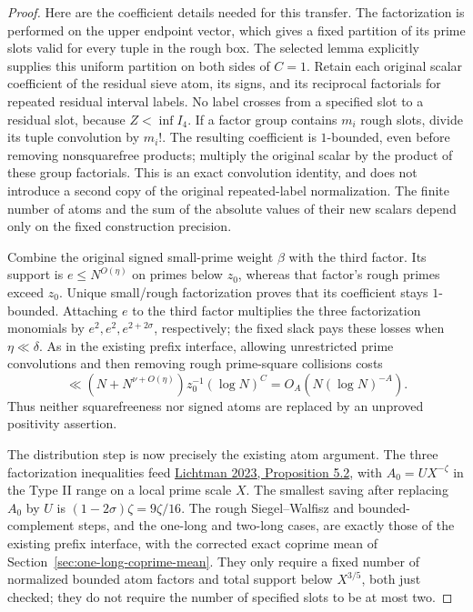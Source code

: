 \begin{proof}
Here are the coefficient details needed for this transfer.  The
factorization is performed on the upper endpoint vector, which
gives a fixed partition of its prime slots valid for every tuple
in the rough box.  The selected lemma explicitly supplies this
uniform partition on both sides of $C=1$.  Retain each original
scalar coefficient of the residual sieve atom, its signs, and its
reciprocal factorials for repeated residual interval labels.
No label crosses from a specified slot to a residual slot, because
$Z<\inf I_4$.  If a factor group contains $m_i$ rough slots,
divide its tuple convolution by $m_i!$.  The resulting coefficient
is $1$-bounded, even before removing nonsquarefree products; multiply
the original scalar by the product of these group factorials.
This is an exact convolution identity, and does not introduce a
second copy of the original repeated-label normalization.
The finite number of atoms and the sum of the absolute values of
their new scalars depend only on the fixed construction precision.

Combine the original signed small-prime weight $\beta$ with the
third factor.  Its support is $e\le N^{O(\eta)}$ on primes below
$z_0$, whereas that factor's rough primes exceed $z_0$.
Unique small/rough factorization proves that its coefficient stays
$1$-bounded.  Attaching $e$ to the third factor multiplies the three
factorization monomials by $e^2,e^2,e^{2+2\sigma}$, respectively;
the fixed slack pays these losses when $\eta\ll\delta$.
As in the existing prefix interface, allowing unrestricted prime
convolutions and then removing rough prime-square collisions costs
\[
 \ll (N+N^{\nu+O(\eta)})z_0^{-1}(\log N)^{C}
   =O_A(N(\log N)^{-A}).
\]
Thus neither squarefreeness nor signed atoms are replaced by an
unproved positivity assertion.

The distribution step is now precisely the existing atom argument.
The three factorization inequalities feed
\href{https://arxiv.org/html/2309.08522v1}{Lichtman 2023,
Proposition 5.2}, with $A_0=UX^{-\zeta}$ in the Type II range
on a local prime scale $X$.
The smallest saving after replacing $A_0$ by $U$ is
$(1-2\sigma)\zeta=9\zeta/16$.
The rough Siegel--Walfisz and bounded-complement steps, and the
one-long and two-long cases, are exactly those of the existing
prefix interface, with the corrected exact coprime mean of
Section~\ref{sec:one-long-coprime-mean}.
They only require a fixed number of normalized bounded atom factors
and total support below $X^{3/5}$, both just checked; they do not
require the number of specified slots to be at most two.


\end{proof}

